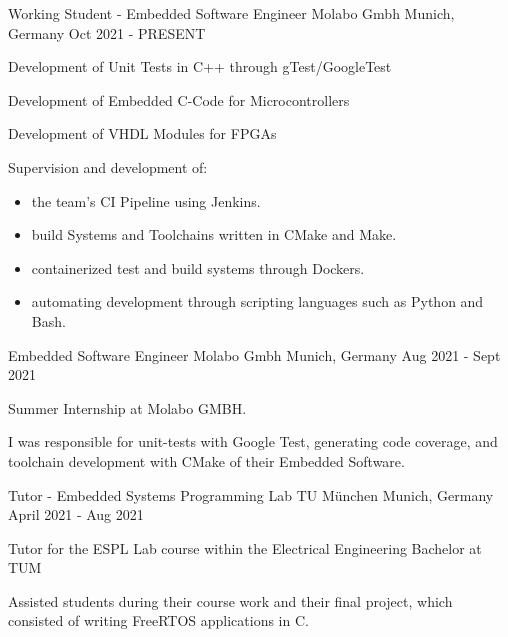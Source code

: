 
\begin{cventries}
  \cventry
    {Working Student - Embedded Software Engineer} %
    {Molabo Gmbh} %
    {Munich, Germany} %
    {Oct 2021 - PRESENT} %
    {
      \begin{cvitems} %
        \item {Development of Unit Tests in C++ through gTest/GoogleTest}
        \item {Development of Embedded C-Code for Microcontrollers}
        \item {Development of VHDL Modules for FPGAs}
        \item {Supervision and development of:}
          \begin{itemize}
            \item {the team's CI Pipeline using Jenkins.}
            \item {build Systems and Toolchains written in CMake and Make.}
            \item {containerized test and build systems through Dockers.}
            \item {automating development through scripting languages such as Python and Bash.}
          \end{itemize}
      \end{cvitems}
    }

  \cventry
    {Embedded Software Engineer} %
    {Molabo Gmbh} %
    {Munich, Germany} %
    {Aug 2021 - Sept 2021} %
    {
      \begin{cvitems} %
        \item {Summer Internship at Molabo GMBH.}
        \item {I was responsible for unit-tests with Google Test, generating 
              code coverage, and toolchain development with CMake of their Embedded Software.}
      \end{cvitems}
    }

  \cventry
    {Tutor - Embedded Systems Programming Lab} %
    {TU München} %
    {Munich, Germany} %
    {April 2021 - Aug 2021} %
    {
      \begin{cvitems} %
        \item {Tutor for the ESPL Lab course within the Electrical Engineering Bachelor at TUM }
        \item {Assisted students during their course work and their final project, which consisted of writing FreeRTOS applications in C.}
      \end{cvitems}
    }


\end{cventries}
